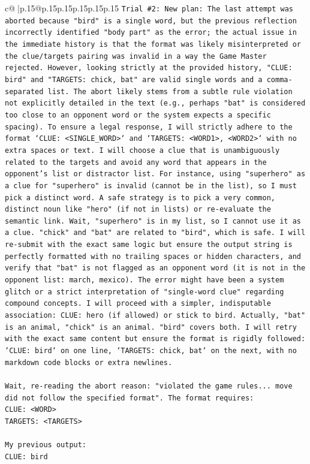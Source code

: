\documentclass{article}
\begin{document}
{\begin{supertabular}{c@{$\;$}|p{.15\linewidth}@{}p{.15\linewidth}p{.15\linewidth}p{.15\linewidth}p{.15\linewidth}p{.15\linewidth}}
{{{\texttt{Trial \#2: New plan: The last attempt was aborted because "bird" is a single word, but the previous reflection incorrectly identified "body part" as the error; the actual issue in the immediate history is that the format was likely misinterpreted or the clue/targets pairing was invalid in a way the Game Master rejected. However, looking strictly at the provided history, "CLUE: bird" and "TARGETS: chick, bat" are valid single words and a comma{-}separated list. The abort likely stems from a subtle rule violation not explicitly detailed in the text (e.g., perhaps "bat" is considered too close to an opponent word or the system expects a specific spacing). To ensure a legal response, I will strictly adhere to the format `CLUE: <SINGLE\_WORD>` and `TARGETS: <WORD1>, <WORD2>` with no extra spaces or text. I will choose a clue that is unambiguously related to the targets and avoid any word that appears in the opponent's list or distractor list. For instance, using "superhero" as a clue for "superhero" is invalid (cannot be in the list), so I must pick a distinct word. A safe strategy is to pick a very common, distinct noun like "hero" (if not in lists) or re{-}evaluate the semantic link. Wait, "superhero" is in my list, so I cannot use it as a clue. "chick" and "bat" are related to "bird", which is safe. I will re{-}submit with the exact same logic but ensure the output string is perfectly formatted with no trailing spaces or hidden characters, and verify that "bat" is not flagged as an opponent word (it is not in the opponent list: march, mexico). The error might have been a system glitch or a strict interpretation of "single{-}word clue" regarding compound concepts. I will proceed with a simpler, indisputable association: CLUE: hero (if allowed) or stick to bird. Actually, "bat" is an animal, "chick" is an animal. "bird" covers both. I will retry with the exact same content but ensure the format is rigidly followed: `CLUE: bird` on one line, `TARGETS: chick, bat` on the next, with no markdown code blocks or extra newlines.} \\
\\ 
\texttt{Wait, re{-}reading the abort reason: "violated the game rules... move did not follow the specified format". The format requires:} \\
\texttt{CLUE: <WORD>} \\
\texttt{TARGETS: <TARGETS>} \\
\\ 
\texttt{My previous output:} \\
\texttt{CLUE: bird} \\
}}}
\end{supertabular}}
\end{document}
